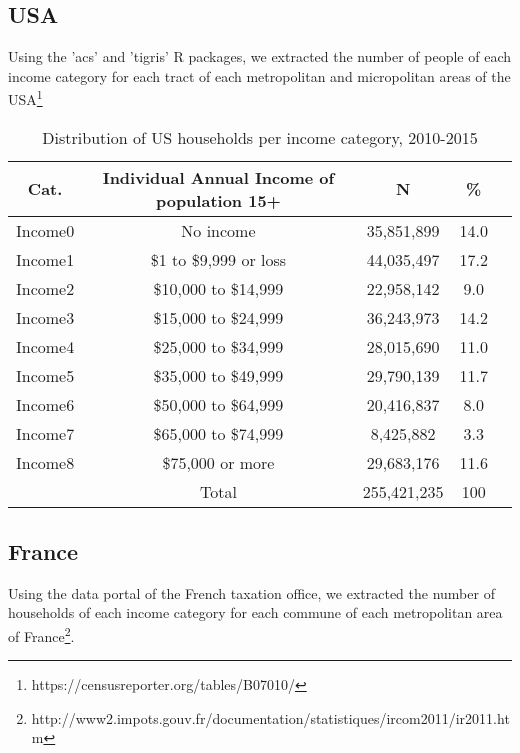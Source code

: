 \documentclass[11.5pt]{article}
\begin{document}
\subsection{USA}

Using the 'acs' and 'tigris' R packages, we extracted the number of people of each income category for each tract of each metropolitan and micropolitan areas of the USA\footnote{https://censusreporter.org/tables/B07010/}	
	
\begin{table}[h!]
\caption{Distribution of US households per income category, 2010-2015}
\label{tab:incomeUSA}
\centering
\begin{tabular}{|c|c|c|c|c||} 
\hline
Cat. & Individual Annual Income of population 15+ & N & \% \\ \hline
 Income0 & No income& 35,851,899 & 14.0 \\
 Income1 & \$1 to \$9,999 or loss & 44,035,497 & 17.2 \\
 Income2 & \$10,000 to \$14,999 & 22,958,142 & 9.0 \\
 Income3 & \$15,000 to \$24,999 & 36,243,973 & 14.2 \\
 Income4 & \$25,000 to \$34,999 & 28,015,690 & 11.0 \\
 Income5 & \$35,000 to \$49,999 & 29,790,139 & 11.7 \\
 Income6 & \$50,000 to \$64,999 &  20,416,837& 8.0 \\
 Income7 & \$65,000 to \$74,999 & 8,425,882 & 3.3 \\
Income8 & \$75,000 or more & 29,683,176 &11.6 \\ \hline
 & Total & 255,421,235 &  100 \\ \hline
\end{tabular}
\end{table}
							

\subsection{France}


Using the data portal of the French taxation office, we extracted the number of households of each income category for each commune of each metropolitan area of France\footnote{http://www2.impots.gouv.fr/documentation/statistiques/ircom2011/ir2011.htm}.		
\end{document}
